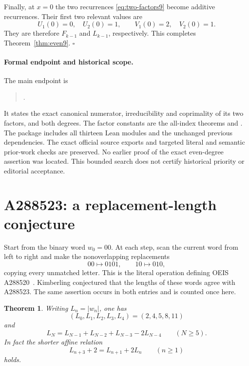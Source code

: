 \documentclass[11pt]{article}
\newtheorem{theorem}{Theorem}[section]
\begin{document}
Finally, at $x=0$ the two recurrences
\eqref{eq:two-factors9} become additive recurrences. Their first two
relevant values are
\[
 U_1(0)=0,\quad U_2(0)=1,\qquad
 V_1(0)=2,\quad V_2(0)=1.
\]
They are therefore $F_{k-1}$ and $L_{k-1}$, respectively. This
completes Theorem~\ref{thm:even9}. \hfill$\square$

\paragraph{Formal endpoint and historical scope.}
The main endpoint is
\begin{quote}\small
{}.
\end{quote}
It states the exact canonical numerator, irreducibility and coprimality
of its two factors, and both degrees. The factor constants are the
all-index theorems  and
. The package includes all thirteen
Lean modules and the unchanged previous dependencies.
The exact official source exports and targeted literal and semantic
prior-work checks are preserved. No earlier proof of the exact
even-degree assertion was located. This bounded search does not
certify historical priority or editorial acceptance.



\section{A288523: a replacement-length conjecture}
\label{sec:a288523}

Start from the binary word $w_0=00$. At each step, scan the current word
from left to right and make the nonoverlapping replacements
\[
  00\longmapsto0101,\qquad 10\longmapsto010,
\]
copying every unmatched letter. This is the literal operation defining
OEIS A288520~\cite{A288520,A288523}. Kimberling conjectured that the lengths of these words
agree with A288523. The same assertion occurs in both entries and is
counted once here.

\begin{theorem}
Writing $L_n=|w_n|$, one has
\[
  (L_0,L_1,L_2,L_3,L_4)=(2,4,5,8,11)
\]
and
\[
  L_N=L_{N-1}+L_{N-2}+L_{N-3}-2L_{N-4}\qquad(N\ge5).
\]
In fact the shorter affine relation
\[
  L_{n+3}+2=L_{n+1}+2L_n\qquad(n\ge1)
\]
holds.
\end{theorem}
\end{document}
